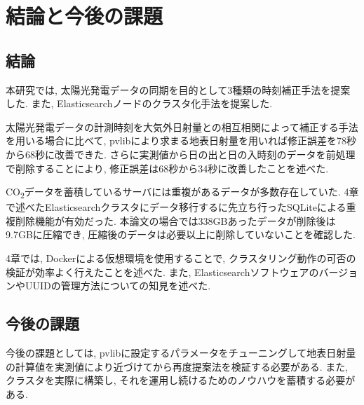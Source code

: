 \chapter{結論と今後の課題}
\label{chap:fifth}

\section{結論}
本研究では, 太陽光発電データの同期を目的として3種類の時刻補正手法を提案した. また, Elasticsearchノードのクラスタ化手法を提案した.

太陽光発電データの計測時刻を大気外日射量との相互相関によって補正する手法を用いる場合に比べて, pvlibにより求まる地表日射量を用いれば修正誤差を78秒から68秒に改善できた. さらに実測値から日の出と日の入時刻のデータを前処理で削除することにより, 修正誤差は68秒から34秒に改善したことを述べた. 

CO\textsubscript{2}データを蓄積しているサーバには重複があるデータが多数存在していた. 4章で述べたElasticsearchクラスタにデータ移行するに先立ち行ったSQLiteによる重複削除機能が有効だった. 本論文の場合では338GBあったデータが削除後は9.7GBに圧縮でき, 圧縮後のデータは必要以上に削除していないことを確認した.

4章では, Dockerによる仮想環境を使用することで, クラスタリング動作の可否の検証が効率よく行えたことを述べた. また, ElasticsearchソフトウェアのバージョンやUUIDの管理方法についての知見を述べた.

\section{今後の課題}

今後の課題としては, pvlibに設定するパラメータをチューニングして地表日射量の計算値を実測値により近づけてから再度提案法を検証する必要がある. また, クラスタを実際に構築し, それを運用し続けるためのノウハウを蓄積する必要がある.

